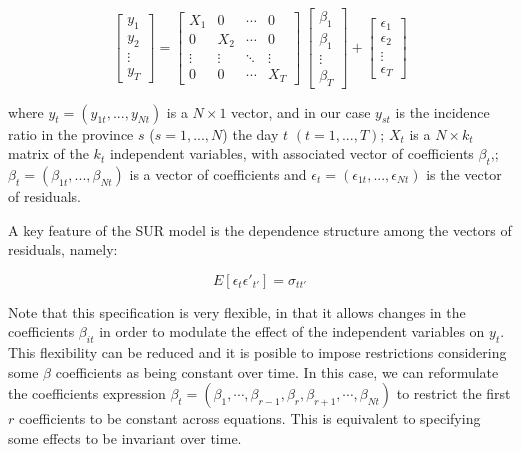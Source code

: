 \documentclass[]{elsarticle} %
\begin{document}
\begin{equation}
\label{eq:sur-sim}
\begin{bmatrix}
y_1 \\ y_2 \\ \vdots \\ y_T
\end{bmatrix}
=
  \begin{bmatrix}
X_1 & 0 & \cdots & 0 \\ 0 & X_2 & \cdots & 0 \\ \vdots & \vdots & \ddots & \vdots \\ 0 & 0 & \cdots & X_T
\end{bmatrix}
\
\begin{bmatrix}
\beta_1 \\ \beta_1 \\ \vdots \\ \beta_T
\end{bmatrix}
+
\begin{bmatrix}
\epsilon_1 \\ \epsilon_2 \\ \vdots \\ \epsilon_T
\end{bmatrix}
\end{equation}

\noindent where \(y_{t}=(y_{1t},...,y_{Nt})\) is a \(N \times 1\)
vector, and in our case \(y_{st}\) is the incidence ratio in the
province \(s\) (\(s=1,...,N\)) the day \(t\) \((t=1,...,T)\); \(X_t\) is
a \(N \times k_t\) matrix of the \(k_t\) independent variables, with
associated vector of coefficients \(\beta_t\),;
\(\beta_t=(\beta_{1t},...,\beta_{Nt})\) is a vector of coefficients and
\(\epsilon_t=(\epsilon_{1t},...,\epsilon_{Nt})\) is the vector of
residuals.

A key feature of the SUR model is the dependence structure among the
vectors of residuals, namely:

\begin{equation}
\label{eq:sur-err}
E[\epsilon_t \epsilon'_{t'}]=\sigma_{tt'}
\end{equation}

Note that this specification is very flexible, in that it allows changes
in the coefficients \(\beta_{it}\) in order to modulate the effect of
the independent variables on \(y_t\). This flexibility can be reduced
and it is posible to impose restrictions considering some \(\beta\)
coefficients as being constant over time. In this case, we can
reformulate the coefficients expression
\(\beta_t = (\beta_{1}, \cdots, \beta_{r-1}, \beta_{r}, \beta_{r+1}, \cdots, \beta_{Nt})\)
to restrict the first \(r\) coefficients to be constant across
equations. This is equivalent to specifying some effects to be invariant
over time.
\end{document}

